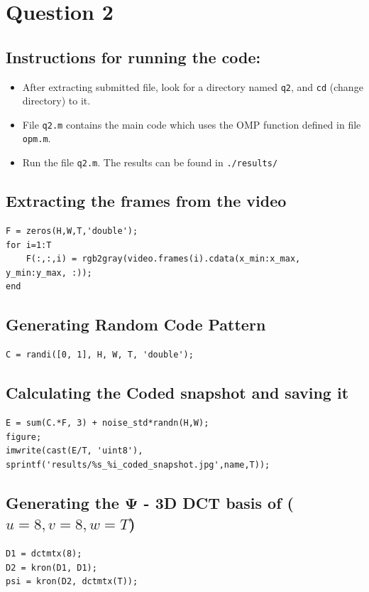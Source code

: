 \documentclass[fleqn, 11pt]{article}
\begin{document}
\newpage
\section*{Question 2}
\setcounter{equation}{0}

\subsection*{Instructions for running the code:}
\begin{itemize}[noitemsep]
    \item After extracting submitted file, look for a directory named \texttt{q2}, and \texttt{cd} (change directory) to it.
    \item File \texttt{q2.m} contains the main code which uses the OMP function defined in file \texttt{opm.m}.
    \item Run the file \texttt{q2.m}. The results can be found in \texttt{./results/} 
\end{itemize}

\subsection*{Extracting the frames from the video}
\begin{verbatim}
F = zeros(H,W,T,'double');
for i=1:T
    F(:,:,i) = rgb2gray(video.frames(i).cdata(x_min:x_max, y_min:y_max, :));
end
\end{verbatim}

\subsection*{Generating Random Code Pattern}
\begin{verbatim}
C = randi([0, 1], H, W, T, 'double');
\end{verbatim}

\subsection*{Calculating the Coded snapshot and saving it}
\begin{verbatim}
E = sum(C.*F, 3) + noise_std*randn(H,W);
figure;
imwrite(cast(E/T, 'uint8'), sprintf('results/%s_%i_coded_snapshot.jpg',name,T));
\end{verbatim}

\subsection*{Generating the $\boldsymbol{\Psi}$ - 3D DCT basis of ($u=8, v=8, w=T$)}
\begin{verbatim}
D1 = dctmtx(8);
D2 = kron(D1, D1);
psi = kron(D2, dctmtx(T));
\end{verbatim}
\end{document}
